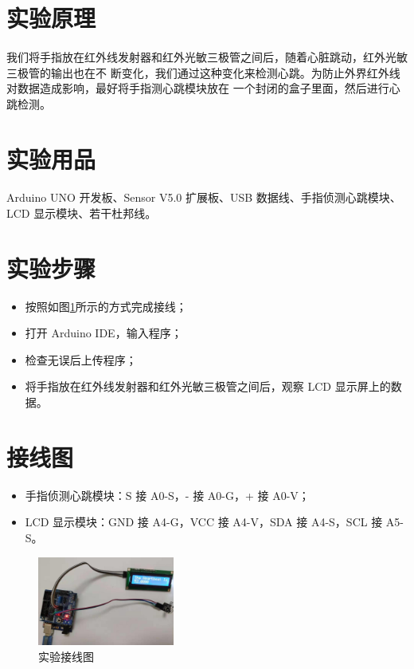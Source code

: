 \documentclass[UTF8, oneside]{ctexbook}
\begin{document}
\section{实验原理}
\paragraph{}
我们将手指放在红外线发射器和红外光敏三极管之间后，随着心脏跳动，红外光敏三极管的输出也在不
断变化，我们通过这种变化来检测心跳。为防止外界红外线对数据造成影响，最好将手指测心跳模块放在
一个封闭的盒子里面，然后进行心跳检测。

\section{实验用品}
\paragraph{}
Arduino UNO 开发板、Sensor V5.0 扩展板、USB 数据线、手指侦测心跳模块、LCD 显示模块、若干杜邦线。


\section{实验步骤}
\begin{itemize}
    \item[(1)] 按照如图\ref{s22_line}所示的方式完成接线；
    \item[(2)] 打开 Arduino IDE，输入程序；
    \item[(3)] 检查无误后上传程序；
    \item[(4)] 将手指放在红外线发射器和红外光敏三极管之间后，观察 LCD 显示屏上的数据。
\end{itemize}


\section{接线图}
\begin{itemize}
    \item 手指侦测心跳模块：S 接 A0-S，- 接 A0-G，+ 接 A0-V；
    \item LCD 显示模块：GND 接 A4-G，VCC 接 A4-V，SDA 接 A4-S，SCL 接 A5-S。
\end{itemize}
\begin{figure}[h]
    \centering
    \includegraphics[width=0.4\textwidth]{./result/sensor/22/lines2.png}
    \caption{实验接线图}
    \label{s22_line}
\end{figure}
\end{document}
